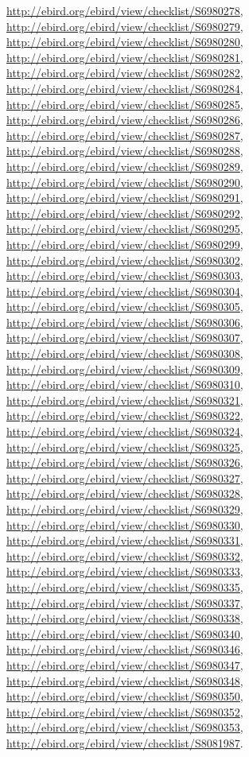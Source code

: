 \documentclass[9pt, article]{memoir}
\begin{document}
\begin{multicols}{2}
\url{http://ebird.org/ebird/view/checklist/S6980278}, 
\url{http://ebird.org/ebird/view/checklist/S6980279}, 
\url{http://ebird.org/ebird/view/checklist/S6980280}, 
\url{http://ebird.org/ebird/view/checklist/S6980281}, 
\url{http://ebird.org/ebird/view/checklist/S6980282}, 
\url{http://ebird.org/ebird/view/checklist/S6980284}, 
\url{http://ebird.org/ebird/view/checklist/S6980285}, 
\url{http://ebird.org/ebird/view/checklist/S6980286}, 
\url{http://ebird.org/ebird/view/checklist/S6980287}, 
\url{http://ebird.org/ebird/view/checklist/S6980288}, 
\url{http://ebird.org/ebird/view/checklist/S6980289}, 
\url{http://ebird.org/ebird/view/checklist/S6980290}, 
\url{http://ebird.org/ebird/view/checklist/S6980291}, 
\url{http://ebird.org/ebird/view/checklist/S6980292}, 
\url{http://ebird.org/ebird/view/checklist/S6980295}, 
\url{http://ebird.org/ebird/view/checklist/S6980299}, 
\url{http://ebird.org/ebird/view/checklist/S6980302}, 
\url{http://ebird.org/ebird/view/checklist/S6980303}, 
\url{http://ebird.org/ebird/view/checklist/S6980304}, 
\url{http://ebird.org/ebird/view/checklist/S6980305}, 
\url{http://ebird.org/ebird/view/checklist/S6980306}, 
\url{http://ebird.org/ebird/view/checklist/S6980307}, 
\url{http://ebird.org/ebird/view/checklist/S6980308}, 
\url{http://ebird.org/ebird/view/checklist/S6980309}, 
\url{http://ebird.org/ebird/view/checklist/S6980310}, 
\url{http://ebird.org/ebird/view/checklist/S6980321}, 
\url{http://ebird.org/ebird/view/checklist/S6980322}, 
\url{http://ebird.org/ebird/view/checklist/S6980324}, 
\url{http://ebird.org/ebird/view/checklist/S6980325}, 
\url{http://ebird.org/ebird/view/checklist/S6980326}, 
\url{http://ebird.org/ebird/view/checklist/S6980327}, 
\url{http://ebird.org/ebird/view/checklist/S6980328}, 
\url{http://ebird.org/ebird/view/checklist/S6980329}, 
\url{http://ebird.org/ebird/view/checklist/S6980330}, 
\url{http://ebird.org/ebird/view/checklist/S6980331}, 
\url{http://ebird.org/ebird/view/checklist/S6980332}, 
\url{http://ebird.org/ebird/view/checklist/S6980333}, 
\url{http://ebird.org/ebird/view/checklist/S6980335}, 
\url{http://ebird.org/ebird/view/checklist/S6980337}, 
\url{http://ebird.org/ebird/view/checklist/S6980338}, 
\url{http://ebird.org/ebird/view/checklist/S6980340}, 
\url{http://ebird.org/ebird/view/checklist/S6980346}, 
\url{http://ebird.org/ebird/view/checklist/S6980347}, 
\url{http://ebird.org/ebird/view/checklist/S6980348}, 
\url{http://ebird.org/ebird/view/checklist/S6980350}, 
\url{http://ebird.org/ebird/view/checklist/S6980352}, 
\url{http://ebird.org/ebird/view/checklist/S6980353}, 
\url{http://ebird.org/ebird/view/checklist/S8081987}.


\end{multicols}
\end{document}
